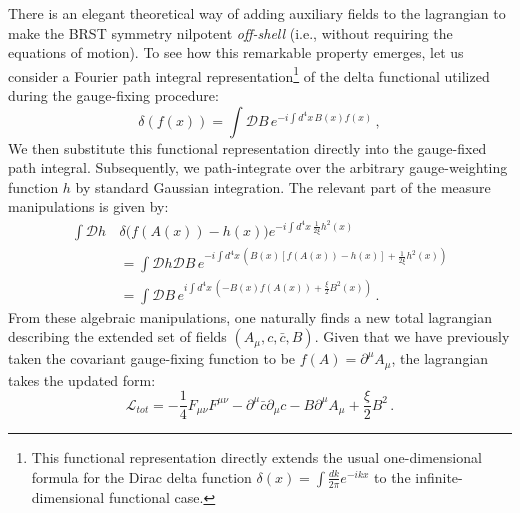 There is an elegant theoretical way of adding auxiliary fields to the lagrangian to make the BRST symmetry nilpotent \textit{off-shell} (i.e., without requiring the equations of motion). To see how this remarkable property emerges, let us consider a Fourier path integral representation\footnote{This functional representation directly extends the usual one-dimensional formula for the Dirac delta function \(\delta(x) = \int \frac{dk}{2\pi} e^{-ikx}\) to the infinite-dimensional functional case.} of the delta functional utilized during the gauge-fixing procedure:
\begin{equation} \label{eq:delta_functional_path_integral}
    \delta(f(x)) = \int \mathcal{D}B \, e^{-i \int d^4x \, B(x) f(x)} \, ,
\end{equation}
We then substitute this functional representation directly into the gauge-fixed path integral. Subsequently, we path-integrate over the arbitrary gauge-weighting function \(h\) by standard Gaussian integration. The relevant part of the measure manipulations is given by:
\begin{equation} \label{eq:path_integral_manipulations}
    \begin{aligned}
        \int \mathcal{D}h \, & \delta\Big(f(A(x)) - h(x)\Big) e^{-i \int d^4x \, \frac{1}{2\xi} h^2(x)}                                           \\
                             & = \int \mathcal{D}h \mathcal{D}B \, e^{-i \int d^4x \, \left( B(x)[f(A(x)) - h(x)] + \frac{1}{2\xi}h^2(x) \right)} \\
                             & = \int \mathcal{D}B \, e^{i \int d^4x \, \left( -B(x)f(A(x)) + \frac{\xi}{2}B^2(x) \right)} \, .
    \end{aligned}
\end{equation}
From these algebraic manipulations, one naturally finds a new total lagrangian describing the extended set of fields \((A_\mu, c, \bar{c}, B)\). Given that we have previously taken the covariant gauge-fixing function to be \(f(A) = \partial^\mu A_\mu\), the lagrangian takes the updated form:
\begin{equation} \label{eq:lagrangian_off_shell}
    \mathcal{L}_{tot} = -\frac{1}{4}F_{\mu\nu}F^{\mu\nu} - \partial^\mu \bar{c} \partial_\mu c - B \partial^\mu A_\mu + \frac{\xi}{2}B^2 \, .
\end{equation}

